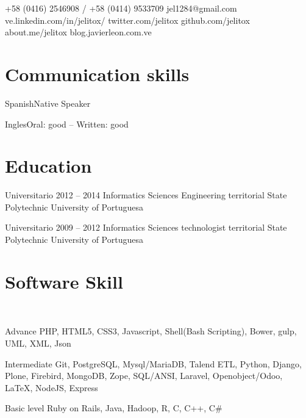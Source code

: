 \documentclass{tccv}
\begin{document}
    {+58 (0416) 2546908 / +58 (0414) 9533709}
    {jel1284@gmail.com}
    {ve.linkedin.com/in/jelitox/}
    {twitter.com/jelitox}
    {github.com/jelitox}
    {about.me/jelitox}
    {blog.javierleon.com.ve}

\section{Communication skills}

\begin{idiomas}
\item{Spanish}{Native Speaker}
\item{Ingles}{Oral: good -- Written: good}
\end{idiomas}
\section{Education}

\begin{estudios}

\item[Universitario]{2012 -- 2014}
     {Informatics Sciences Engineering}
     {territorial State Polytechnic University of Portuguesa}

\item[Universitario]{2009 -- 2012}
     {Informatics Sciences technologist}
     {territorial State Polytechnic University of Portuguesa}

\end{estudios}

\section{Software Skill}

\begin{software}
\\
\item{Advance}
     {PHP, HTML5, CSS3, Javascript, Shell(Bash Scripting), Bower, gulp, UML, XML, Json} \\
\item{Intermediate}
     {Git, PostgreSQL, Mysql/MariaDB, Talend ETL, Python, Django, Plone, Firebird, MongoDB, Zope, SQL/ANSI, Laravel, Openobject/Odoo, \LaTeX, NodeJS, Express } \\
\item{Basic level}
     {Ruby on Rails, Java, Hadoop, R, C, C++, C\#} \\

\end{software}
\end{document}
